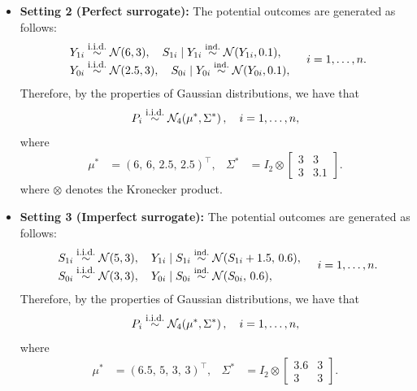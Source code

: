 \documentclass[referee,usenatbib]{biom}
\newcommand{\iid}{\overset{\text{\footnotesize i.i.d.}}{\sim}}
\newcommand{\indepsim}{\overset{\text{ind.}}{\sim}}
\begin{document}
\begin{itemize}[leftmargin=*]
    \item \textbf{Setting 2 (Perfect surrogate):} The potential outcomes are generated as follows:
    \begin{equation*}
    \begin{array}{l}
        Y_{1i} \iid \mathcal{N}(6, 3), \quad S_{1i} \mid Y_{1i} \indepsim \mathcal{N}(Y_{1i}, 0.1), \\
        Y_{0i} \iid \mathcal{N}(2.5, 3), \quad S_{0i} \mid Y_{0i} \indepsim \mathcal{N}(Y_{0i}, 0.1),
    \end{array}
    \quad i = 1, \ldots, n.
    \end{equation*}
    Therefore, by the properties of Gaussian distributions, we have that
    \begin{equation*}
        P_{i} \iid \mathcal{N}_4\!\left(\mu^*, \Sigma^*\right), \quad i = 1, \ldots, n,
    \end{equation*}
    where
    \begin{align*}
        \mu^* &= (6,\, 6,\, 2.5,\, 2.5)^\top, &
        \Sigma^* &= I_2 \otimes \begin{bmatrix} 3 & 3 \\ 3 & 3.1 \end{bmatrix}.
    \end{align*}
    where \(\otimes\) denotes the Kronecker product.
    \item \textbf{Setting 3 (Imperfect surrogate):} The potential outcomes are generated as follows:
    \begin{equation*}
    \begin{array}{l}
        S_{1i} \iid \mathcal{N}(5, 3), \quad Y_{1i} \mid S_{1i} \indepsim \mathcal{N}(S_{1i} + 1.5,\, 0.6), \\
        S_{0i} \iid \mathcal{N}(3, 3), \quad Y_{0i} \mid S_{0i} \indepsim \mathcal{N}(S_{0i},\, 0.6),
    \end{array}
    \quad i = 1, \ldots, n.
    \end{equation*}
    Therefore, by the properties of Gaussian distributions, we have that
    \begin{equation*}
        P_{i} \iid \mathcal{N}_4\!\left(\mu^*, \Sigma^*\right), \quad i = 1, \ldots, n,
    \end{equation*}
    where
    \begin{align*}
        \mu^* &= (6.5,\, 5,\, 3,\, 3)^\top, &
        \Sigma^* &= I_2 \otimes \begin{bmatrix} 3.6 & 3 \\ 3 & 3 \end{bmatrix}.

\end{align*}
\end{itemize}
\end{document}
